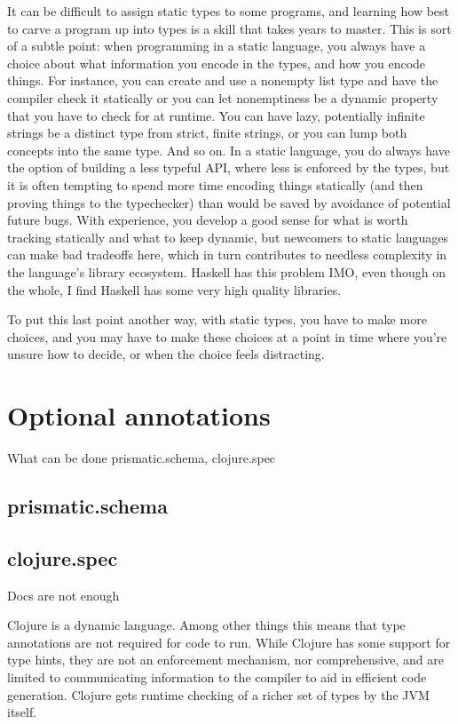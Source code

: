 It can be difficult to assign static types to some programs, and learning how
best to carve a program up into types is a skill that takes years to master.
This is sort of a subtle point: when programming in a static language, you
always have a choice about what information you encode in the types, and how you
encode things. For instance, you can create and use a nonempty list type and
have the compiler check it statically or you can let nonemptiness be a dynamic
property that you have to check for at runtime. You can have lazy, potentially
infinite strings be a distinct type from strict, finite strings, or you can lump
both concepts into the same type. And so on. In a static language, you do always
have the option of building a less typeful API, where less is enforced by the
types, but it is often tempting to spend more time encoding things statically
(and then proving things to the typechecker) than would be saved by avoidance of
potential future bugs. With experience, you develop a good sense for what is
worth tracking statically and what to keep dynamic, but newcomers to static
languages can make bad tradeoffs here, which in turn contributes to needless
complexity in the language’s library ecosystem. Haskell has this problem IMO,
even though on the whole, I find Haskell has some very high quality libraries.

To put this last point another way, with static types, you have to make more
choices, and you may have to make these choices at a point in time where you’re
unsure how to decide, or when the choice feels distracting.

\section{Optional annotations}
What can be done prismatic.schema, clojure.spec
\subsection{prismatic.schema}
\subsection{clojure.spec}
Docs are not enough

Clojure is a dynamic language. Among other things this means that type
annotations are not required for code to run. While Clojure has some support for
type hints, they are not an enforcement mechanism, nor comprehensive, and are
limited to communicating information to the compiler to aid in efficient code
generation. Clojure gets runtime checking of a richer set of types by the JVM
itself.

